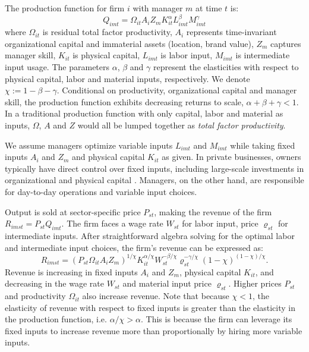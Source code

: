 \documentclass[11pt,a4paper]{article}
\begin{document}
The production function for firm $i$ with manager $m$ at time $t$ is:
\begin{equation}
Q_{imt} = \Omega_{it}A_i Z_{m}  K_{it}^\alpha L_{imt}^{\beta} M_{imt}^{\gamma}
\end{equation}
where $\Omega_{it}$ is residual total factor productivity, $A_i$ represents time-invariant organizational capital and immaterial assets (location, brand value), $Z_m$ captures manager skill, $K_{it}$ is physical capital, $L_{imt}$ is labor input, $M_{imt}$ is intermediate input usage. The parameters $\alpha$, $\beta$ and $\gamma$ represent the elasticities with respect to physical capital, labor and material inputs, respectively. We denote $\chi := 1 - \beta - \gamma$. Conditional on productivity, organizational capital and manager skill, the production function exhibits decreasing returns to scale, $\alpha + \beta + \gamma < 1$. In a traditional production function with only capital, labor and material as inputs, $\Omega$, $A$ and $Z$ would all be lumped together as \emph{total factor productivity}.

We assume managers optimize variable inputs $L_{imt}$ and $M_{imt}$ while taking fixed inputs $A_{i}$ and $Z_m$ and physical capital $K_{it}$ as given. In private businesses, owners typically have direct control over fixed inputs, including large-scale investments in organizational and physical capital \citep{Navaretti2010EFIGE}. Managers, on the other hand, are responsible for day-to-day operations and variable input choices.

Output is sold at sector-specific price $P_{st}$, making the revenue of the firm $R_{imst} = P_{st}Q_{imt}$. The firm faces a wage rate $W_{st}$ for labor input, price $\varrho_{st}$ for intermediate inputs. After straightforward algebra solving for the optimal labor and intermediate input choices, the firm's revenue can be expressed as:
\begin{equation}\label{eq:revenue}
R_{imst} = (P_{st}\Omega_{it}A_i Z_m)^{1/\chi}
K_{it}^{\alpha/\chi}
W_{st}^{-\beta/\chi}
\varrho_{st}^{-\gamma/\chi}
(1-\chi)^{(1-\chi)/\chi}.
\end{equation}
Revenue is increasing in fixed inputs $A_i$ and $Z_m$, physical capital $K_{it}$, and decreasing in the wage rate $W_{st}$ and material input price $\varrho_{st}$. Higher prices $P_{st}$ and productivity $\Omega_{it}$ also increase revenue. Note that because $\chi<1$, the elasticity of revenue with respect to fixed inputs is greater than the elasticity in the production function, i.e. $\alpha/\chi > \alpha$. This is because the firm can leverage its fixed inputs to increase revenue more than proportionally by hiring more variable inputs.
\end{document}
